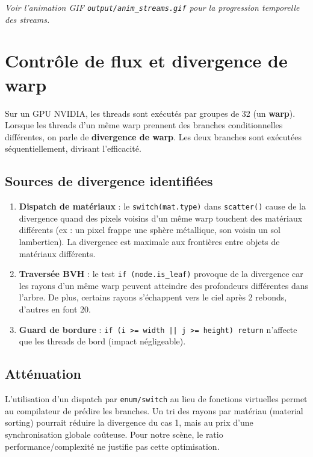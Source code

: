 \documentclass[12pt,a4paper]{article}
\begin{document}
\textit{Voir l'animation GIF \texttt{output/anim\_streams.gif} pour la progression temporelle des streams.}

\section{Contrôle de flux et divergence de warp}

Sur un GPU NVIDIA, les threads sont exécutés par groupes de 32 (un \textbf{warp}).
Lorsque les threads d'un même warp prennent des branches conditionnelles différentes,
on parle de \textbf{divergence de warp}. Les deux branches sont exécutées
séquentiellement, divisant l'efficacité.

\subsection{Sources de divergence identifiées}

\begin{enumerate}
    \item \textbf{Dispatch de matériaux} : le \texttt{switch(mat.type)} dans
    \texttt{scatter()} cause de la divergence quand des pixels voisins d'un même
    warp touchent des matériaux différents (ex : un pixel frappe une sphère métallique,
    son voisin un sol lambertien). La divergence est maximale aux frontières
    entre objets de matériaux différents.

    \item \textbf{Traversée BVH} : le test \texttt{if (node.is\_leaf)} provoque
    de la divergence car les rayons d'un même warp peuvent atteindre des profondeurs
    différentes dans l'arbre. De plus, certains rayons s'échappent vers le ciel
    après 2 rebonds, d'autres en font 20.

    \item \textbf{Guard de bordure} : \texttt{if (i >= width || j >= height) return}
    n'affecte que les threads de bord (impact négligeable).
\end{enumerate}

\subsection{Atténuation}

L'utilisation d'un dispatch par \texttt{enum/switch} au lieu de fonctions virtuelles
permet au compilateur de prédire les branches. Un tri des rayons par matériau
(material sorting) pourrait réduire la divergence du cas 1, mais au prix
d'une synchronisation globale coûteuse. Pour notre scène, le ratio performance/complexité
ne justifie pas cette optimisation.
\end{document}
